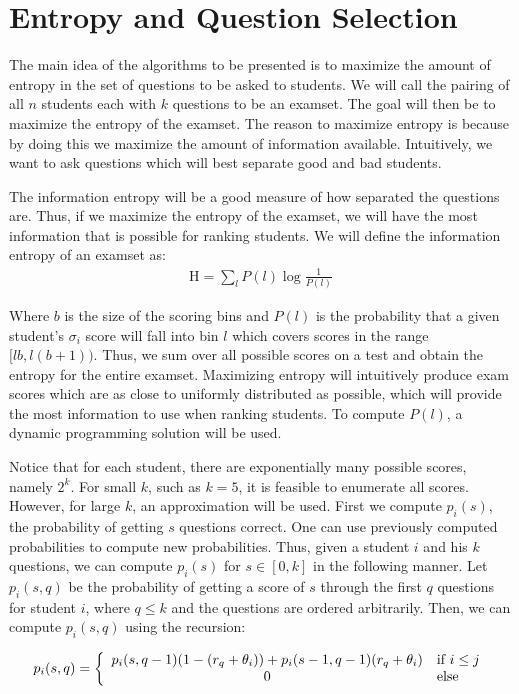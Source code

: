 \documentclass[psamsfonts]{amsart}
\begin{document}
\section{Entropy and Question Selection}

The main idea of the algorithms to be presented is to maximize the amount of entropy in the set of questions to be asked to students. We will call the pairing of all $n$ students each with $k$ questions to be an examset. The goal will then be to maximize the entropy of the examset. The reason to maximize entropy is because by doing this we maximize the amount of information available. Intuitively, we want to ask questions which will best separate good and bad students.

The information entropy will be a good measure of how separated the questions are. Thus, if we maximize the entropy of the examset, we will have the most information that is possible for ranking students. We will define the information entropy of an examset as:
\begin{eqnarray}
\mathrm{H} = \sum_{l} P(l) \log \frac{1}{P(l)}
\end{eqnarray}

Where $b$ is the size of the scoring bins and $P(l)$ is the probability that a given student's $\sigma_i$ score will fall into bin $l$ which covers scores in the range $[lb, l(b+1))$. Thus, we sum over all possible scores on a test and obtain the entropy for the entire examset. Maximizing entropy will intuitively produce exam scores which are as close to uniformly distributed as possible, which will provide the most information to use when ranking students. To compute $P(l)$, a dynamic programming solution will be used.

Notice that for each student, there are exponentially many possible scores, namely $2^k$. For small $k$, such as $k=5$, it is feasible to enumerate all scores. However, for large $k$, an approximation will be used. First we compute $p_i(s)$, the probability of getting $s$ questions correct. One can use previously computed probabilities to compute new probabilities. Thus, given a student $i$ and his $k$ questions, we can compute $p_i(s)$ for $s \in [0, k]$ in the following manner. Let $p_i(s, q)$ be the probability of getting a score of $s$ through the first $q$ questions for student $i$, where $q \leq k$ and the questions are ordered arbitrarily. Then, we can compute $p_i(s, q)$ using the recursion:

\begin{eqnarray}
p_i(s, q) = \left\{ \begin{array}{c l}
p_i(s, q-1) (1-(r_q + \theta_i)) + p_i(s-1,q-1) (r_q + \theta_i) & \text{if } i \leq j \\ 
0 & \text{else}
\end{array} \right.
\end{eqnarray}
\end{document}
